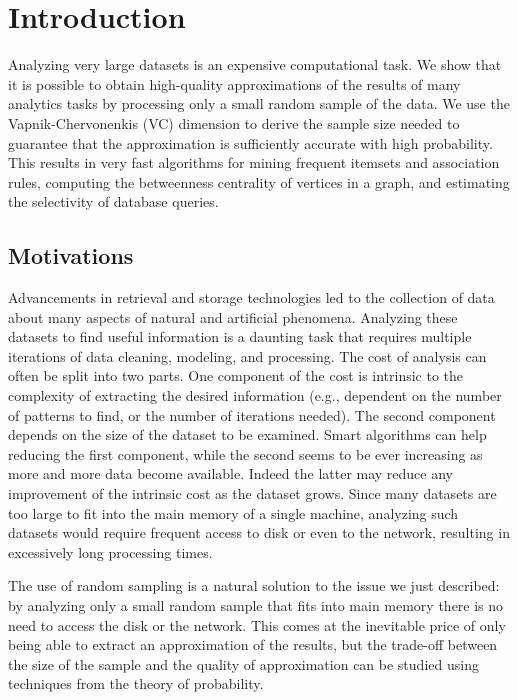 \chapter{Introduction}\label{ch:intro}

 Analyzing very large datasets is an expensive
computational task. We show that it is possible to obtain high-quality
approximations of the results of many analytics tasks by processing only a small
random sample of the data. We use the Vapnik-Chervonenkis (VC) dimension to
derive the sample size needed to guarantee that the approximation is
sufficiently accurate with high probability. This results in very fast
algorithms for mining frequent itemsets and association rules, computing the
betweenness centrality of vertices in a graph, and estimating the selectivity of
database queries.

\section{Motivations}
Advancements in retrieval and storage technologies led to the collection of
data about many aspects of natural and artificial phenomena.
Analyzing these datasets to find useful information is a daunting task that
requires multiple iterations of data cleaning, modeling, and processing. The
cost of analysis can often be split into two parts. One component of the cost is
intrinsic to the complexity of extracting the desired information (e.g.,
dependent on the number of patterns to find, or the number of iterations
needed). The second component depends on the size of the dataset to be examined.
Smart algorithms can help reducing the first component, while the second seems
to be ever increasing as more and more data become available. Indeed the latter
may reduce any improvement of the intrinsic cost as the dataset grows. Since
many datasets are too large to fit into the main memory of a single machine,
analyzing such datasets would require frequent access to disk or even to the
network, resulting in excessively long processing times.

The use of random sampling is a natural solution to the issue we just described:
by analyzing only a small random sample that fits into main memory there is no
need to access the disk or the network. This comes at the inevitable price of
only being able to extract an approximation of the results, but the trade-off
between the size of the sample and the quality of approximation can be studied
using techniques from the theory of probability. 

